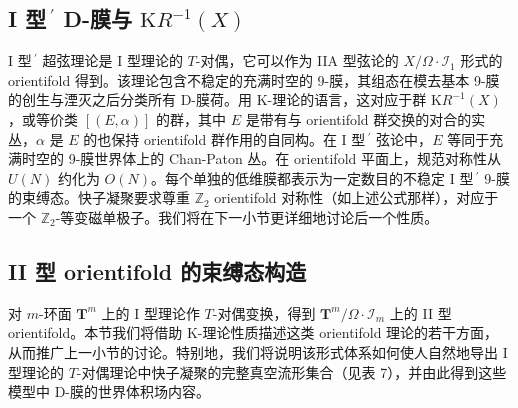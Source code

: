 \documentclass[11pt,a4paper]{ctexart}
\newcommand{\SrcRange}[2]{\marginpar{\raggedright\footnotesize 原文 p.#1}}
\begin{document}
\SrcRange{74}{74}
\subsection{\texorpdfstring{I 型\(\,^\prime\) D-膜与 \({\mathrm KR}^{-1}(X)\)}{I 型\textbackslash,\^{}\textbackslash prime D-膜与 \{\textbackslash mathrm KR\}\^{}\{-1\}(X)}}\label{i-ux578bprime-d-ux819cux4e0e-mathrm-kr-1x}

I 型\(\,^\prime\) 超弦理论是 I 型理论的 \(T\)-对偶，它可以作为 IIA 型弦论的 \(X/\Omega\cdot {\mathcal I}_1\) 形式的 orientifold 得到。该理论包含不稳定的充满时空的 9-膜，其组态在模去基本 9-膜的创生与湮灭之后分类所有 D-膜荷。用 K-理论的语言，这对应于群 \({\mathrm KR}^{-1}(X)\)，或等价类 \([(E,\alpha)]\) 的群，其中 \(E\) 是带有与 orientifold 群交换的对合的实丛，\(\alpha\) 是 \(E\) 的也保持 orientifold 群作用的自同构。在 I 型\(\,^\prime\) 弦论中，\(E\) 等同于充满时空的 9-膜世界体上的 Chan-Paton 丛。在 orientifold 平面上，规范对称性从 \(U(N)\) 约化为 \(O(N)\)。每个单独的低维膜都表示为一定数目的不稳定 I 型\(\,^\prime\) 9-膜的束缚态。快子凝聚要求尊重 \({\mathbb{Z}}_2\) orientifold 对称性（如上述公式那样），对应于一个 \({\mathbb{Z}}_2\)-等变磁单极子。我们将在下一小节更详细地讨论后一个性质。

\SrcRange{74}{74}
\subsection{II 型 orientifold 的束缚态构造}\label{ii-ux578b-orientifold-ux7684ux675fux7f1aux6001ux6784ux9020}

对 \(m\)-环面 \({\mathbf T}^m\) 上的 I 型理论作 \(T\)-对偶变换，得到 \({\mathbf T}^m/\Omega\cdot{\mathcal I}_m\) 上的 II 型 orientifold。本节我们将借助 K-理论性质描述这类 orientifold 理论的若干方面，从而推广上一小节的讨论。特别地，我们将说明该形式体系如何使人自然地导出 I 型理论的 \(T\)-对偶理论中快子凝聚的完整真空流形集合（见表 7），并由此得到这些模型中 D-膜的世界体积场内容。
\end{document}
